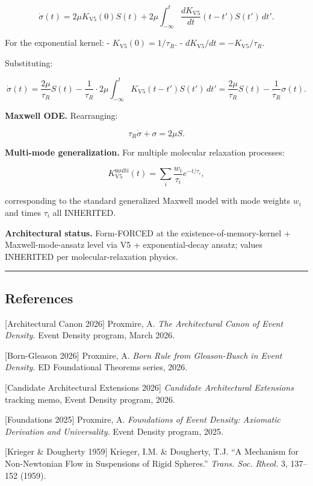 \documentclass[
  11pt,a4paper]{article}
\begin{document}
\[\dot\sigma(t) = 2\mu K_\mathrm{V5}(0) S(t) + 2\mu \int_{-\infty}^t \frac{dK_\mathrm{V5}}{dt}(t-t') S(t') \, dt'.\]

For the exponential kernel: - \(K_\mathrm{V5}(0) = 1/\tau_R\). -
\(dK_\mathrm{V5}/dt = -K_\mathrm{V5}/\tau_R\).

Substituting:

\[\dot\sigma(t) = \frac{2\mu}{\tau_R} S(t) - \frac{1}{\tau_R} \cdot 2\mu \int_{-\infty}^t K_\mathrm{V5}(t-t') S(t') \, dt' = \frac{2\mu}{\tau_R} S(t) - \frac{1}{\tau_R} \sigma(t).\]

\textbf{Maxwell ODE.} Rearranging:

\[\tau_R \dot\sigma + \sigma = 2\mu S.\]

\textbf{Multi-mode generalization.} For multiple molecular relaxation
processes:

\[K_\mathrm{V5}^\mathrm{multi}(t) = \sum_i \frac{w_i}{\tau_i} e^{-t/\tau_i},\]

corresponding to the standard generalized Maxwell model with mode
weights \(w_i\) and times \(\tau_i\) all INHERITED.

\textbf{Architectural status.} Form-FORCED at the
existence-of-memory-kernel + Maxwell-mode-ansatz level via V5 +
exponential-decay ansatz; values INHERITED per molecular-relaxation
physics.

\begin{center}\rule{0.5\linewidth}{0.5pt}\end{center}

\subsection{References}\label{references}

{[}Architectural Canon 2026{]} Proxmire, A. \emph{The Architectural
Canon of Event Density.} Event Density program, March 2026.

{[}Born-Gleason 2026{]} Proxmire, A. \emph{Born Rule from Gleason-Busch
in Event Density.} ED Foundational Theorems series, 2026.

{[}Candidate Architectural Extensions 2026{]} \emph{Candidate
Architectural Extensions} tracking memo, Event Density program, 2026.

{[}Foundations 2025{]} Proxmire, A. \emph{Foundations of Event Density:
Axiomatic Derivation and Universality.} Event Density program, 2025.

{[}Krieger \& Dougherty 1959{]} Krieger, I.M. \& Dougherty, T.J. ``A
Mechanism for Non-Newtonian Flow in Suspensions of Rigid Spheres.''
\emph{Trans. Soc. Rheol.} 3, 137--152 (1959).
\end{document}
